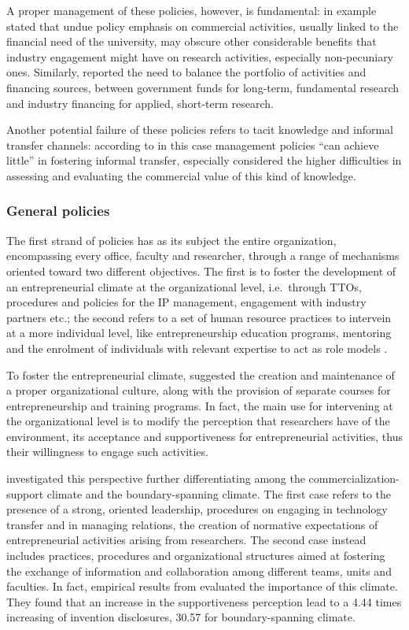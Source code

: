 A proper management of these policies, however, is fundamental: \citet{DEste2011} in example stated that undue policy emphasis on commercial activities, usually linked to the financial need of the university, may obscure other considerable benefits that industry engagement might have on research activities, especially non-pecuniary ones. Similarly, \citet{Debackere2005} reported the need to balance the portfolio of activities and financing sources, between government funds for long-term, fundamental research and industry financing for applied, short-term research. 

Another potential failure of these policies refers to tacit knowledge and informal transfer channels: according to \citet{Muscio2010} in this case management policies \enquote{can achieve little} in fostering informal transfer, especially considered the higher difficulties in assessing and evaluating the commercial value of this kind of knowledge. 

\subsubsection{General policies}

The first strand of policies has as its subject the entire organization, encompassing every office, faculty and researcher, through a range of mechanisms oriented toward two different objectives. The first is to foster the development of an entrepreneurial climate at the organizational level, i.e.\ through TTOs, procedures and policies for the IP management, engagement with industry partners etc.; the second refers to a set of human resource practices to intervein at a more individual level, like entrepreneurship education programs, mentoring and the enrolment of individuals with relevant expertise to act as role models \citep{Guerrero2014}. 

To foster the entrepreneurial climate, \citet{Klofsten2000} suggested the creation and maintenance of a proper organizational culture, along with the provision of separate courses for entrepreneurship and training programs. In fact, the main use for intervening at the organizational level is to modify the perception that researchers have of the environment, its acceptance and supportiveness for entrepreneurial activities, thus their willingness to engage such activities.

\citet{Hunter2011} investigated this perspective further differentiating among the commercialization-support climate and the boundary-spanning climate. The first case refers to the presence of a strong, oriented leadership, procedures on engaging in technology transfer and in managing relations, the creation of normative expectations of entrepreneurial activities arising from researchers. The second case instead includes practices, procedures and organizational structures aimed at fostering the exchange of information and collaboration among different teams, units and faculties. In fact, empirical results from \citet{Hunter2011} evaluated the importance of this climate. They found that an increase in the supportiveness perception lead to a 4.44 times increasing of invention disclosures, 30.57 for boundary-spanning climate. 

